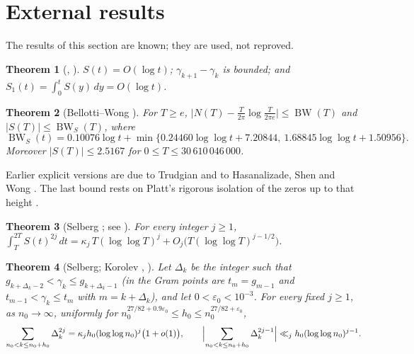 \documentclass[preprint,12pt]{elsarticle}
\numberwithin{equation}{section}
\theoremstyle{plain}
\newtheorem{theorem}{Theorem}[section]
\theoremstyle{definition}
\theoremstyle{remark}
\newcommand{\BW}{\operatorname{BW}}
\newcommand{\BWS}{\operatorname{BW}_S}
\begin{document}
\section{External results}
\label{sec:known_results}

The results of this section are known; they are used, not reproved.

\begin{theorem}[{\cite[Thms.~9.4, 9.9 and \S9.12]{Titchmarsh1986}}, {\cite{Littlewood1924}}]\label{thm:known_basic}
$S(t)=O(\log t)$; $\gamma_{k+1}-\gamma_k$ is bounded; and $S_1(t)=\int_0^tS(y)\,dy=O(\log t)$.
\end{theorem}

\begin{theorem}[Bellotti--Wong {\cite[Thm.~1.1, Cor.~1.5 and (1.2)]{BellottiWong2025}}]\label{thm:known_BW}
For $T\ge e$, $\bigl|N(T)-\frac T{2\pi}\log\frac T{2\pi e}\bigr|\le\BW(T)$ and $|S(T)|\le\BWS(T)$, where
\begin{equation}
\BWS(t)=0.10076\log t+\min\{0.24460\log\log t+7.20844,\ 1.68845\log\log t+1.50956\}.
\label{eq:BWS_def}
\end{equation}
Moreover $|S(T)|\le2.5167$ for $0\le T\le30\,610\,046\,000$.
\end{theorem}
Earlier explicit versions are due to Trudgian \cite{Trudgian2014} and to Hasanalizade, Shen and Wong \cite{HasanalizadeShenWong2022}. The last bound rests on Platt's rigorous isolation of the zeros up to that height \cite[(1.2)]{BellottiWong2025}.

\begin{theorem}[Selberg {\cite{Selberg1946a}}; see {\cite[p.~225]{Fujii1974}}]\label{thm:known_selberg_moments}
For every integer $j\ge1$, $\int_T^{2T}S(t)^{2j}\,dt=\kappa_j\,T(\log\log T)^j+O_j\bigl(T(\log\log T)^{j-1/2}\bigr)$.
\end{theorem}

\begin{theorem}[Selberg; Korolev {\cite{Korolev2012}}, {\cite[Thm.~4.2]{Korolev2011}}]\label{thm:known_korolev}
Let $\Delta_k$ be the integer such that $g_{k+\Delta_k-2}<\gamma_k\le g_{k+\Delta_k-1}$ (in \cite{Korolev2011} the Gram points are $t_m=g_{m-1}$ and $t_{m-1}<\gamma_k\le t_m$ with $m=k+\Delta_k$), and let $0<\varepsilon_0<10^{-3}$. For every fixed $j\ge1$, as $n_0\to\infty$, uniformly for $n_0^{27/82+0.9\varepsilon_0}\le h_0\le n_0^{27/82+\varepsilon_0}$,
\begin{equation}
\sum_{n_0<k\le n_0+h_0}\Delta_k^{2j}=\kappa_jh_0(\log\log n_0)^j\bigl(1+o(1)\bigr),\qquad
\Bigl|\sum_{n_0<k\le n_0+h_0}\Delta_k^{2j-1}\Bigr|\ll_j h_0(\log\log n_0)^{j-1}.
\label{eq:korolev_moments}
\end{equation}
\end{theorem}
\end{document}

